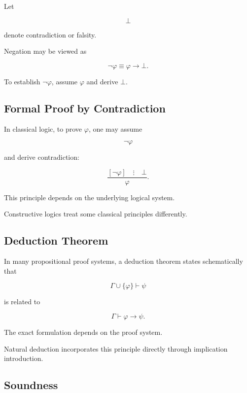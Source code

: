 Let

\[
\bot
\]

denote contradiction or falsity.

Negation may be viewed as

\[
\boxed{
\neg\varphi
\equiv
\varphi\rightarrow\bot.
}
\]

To establish \(\neg\varphi\), assume \(\varphi\) and derive \(\bot\).

\subsection{Formal Proof by Contradiction}
\label{subsec:formal-proof-by-contradiction}

In classical logic, to prove \(\varphi\), one may assume

\[
\neg\varphi
\]

and derive contradiction:

\[
\boxed{
\frac{
[\neg\varphi]
\quad
\vdots
\quad
\bot
}{
\varphi
}.
}
\]

This principle depends on the underlying logical system.

Constructive logics treat some classical principles differently.

\subsection{Deduction Theorem}
\label{subsec:deduction-theorem-formal}

In many propositional proof systems, a deduction theorem states
schematically that

\[
\boxed{
\Gamma\cup\{\varphi\}
\vdash
\psi
}
\]

is related to

\[
\boxed{
\Gamma
\vdash
\varphi\rightarrow\psi.
}
\]

The exact formulation depends on the proof system.

Natural deduction incorporates this principle directly through implication
introduction.

\subsection{Soundness}
\label{subsec:formal-soundness}

